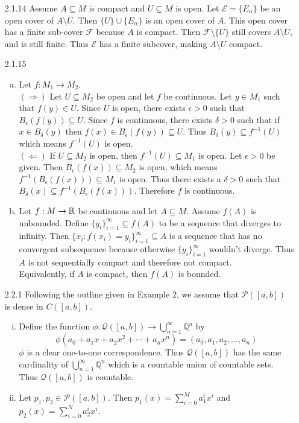 \documentclass[../../Solutions.tex]{subfiles}
\begin{document}
\begin{itemize}
	\item [2.1.14] Assume $A \subseteq M$ is compact and $U \subseteq M$ is open.
		Let $\mathcal{E} = \{E_\alpha\}$ be an open cover of $A \setminus U$.
		Then $\{U\} \cup \{E_\alpha\}$ is an open cover of $A$.
		This open cover has a finite sub-cover $\mathcal{F}$ because $A$ is compact.
		Then $\mathcal{F} \setminus \{U\}$ still covers $A \setminus U$, and is still finite.
		Thus $\mathcal{E}$ has a finite subcover, making $A \setminus U$ compact.
		
	\item [2.1.15]
	\begin{enumerate}[(a)]
		\item Let $f:M_1 \to M_2$. \\
			$(\Rightarrow)$ Let $U \subseteq M_2$ be open and let $f$ be continuous.
			Let $y \in M_1$ such that $f(y) \in U$.
			Since $U$ is open, there exists $\epsilon > 0$ such that $B_\epsilon(f(y)) \subseteq U$.
			Since $f$ is continuous, there exists $\delta > 0$ such that if $x \in B_\delta(y)$ then $f(x) \in B_\epsilon(f(y)) \subseteq U$.
			Thus $B_\delta(y) \subseteq f^{-1}(U)$ which means $f^{-1}(U)$ is open. \\
			$(\Leftarrow)$ If $U \subseteq M_2$ is open, then $f^{-1}(U) \subseteq M_1$ is open.
			Let $\epsilon > 0$ be given.
			Then $B_\epsilon(f(x)) \subseteq M_2$ is open, which means $f^{-1}(B_\epsilon(f(x))) \subseteq M_1$ is open.
			Thus there exists a $\delta > 0$ such that $B_\delta(x) \subseteq f^{-1}(B_\epsilon(f(x)))$.
			Therefore $f$ is continuous.
		\item Let $f:M \to \mathbb{R}$ be continuous and let $A \subseteq M$.
			Assume $f(A)$ is unbounded.
			Define $\{y_i\}_{i=1}^\infty \subseteq f(A)$ to be a sequence that diverges to infinity.
			Then $\{x_i:f(x_i) = y_i\}_{i=1}^\infty \subseteq A$ is a sequence that has no convergent subsequence because otherwise $\{y_i\}_{i=1}^\infty$ wouldn't diverge.
			Thus $A$ is not sequentially compact and therefore not compact. \\
			Equivalently, if $A$ is compact, then $f(A)$ is bounded.
	\end{enumerate}
	
	\item [2.2.1] Following the outline given in Example 2, we assume that $\mathcal{P}([a,b])$ is dense in $C([a,b])$.
	\begin{enumerate}[(i)]
		\item Define the function $\phi : \mathcal{Q}([a,b]) \to \bigcup_{n=1}^\infty \mathbb{Q}^n$ by
			$$ \phi(a_0+a_1x+a_2x^2+\cdots + a_nx^n) = (a_0,a_1,a_2,\dots,a_n) $$
			$\phi$ is a clear one-to-one correspondence.
			Thus $\mathcal{Q}([a,b])$ has the same cardinality of $\bigcup_{n=1}^\infty \mathbb{Q}^n$ which is a countable union of countable sets.
			Thus $\mathcal{Q}([a,b])$ is countable.
		\item Let $p_1,p_2 \in \mathcal{P}([a,b])$.
			Then $p_1(x) = \sum_{i=0}^M a_1^i x^i$ and $p_2(x) = \sum_{i=0}^N a_2^i x^i$.
	\end{enumerate}
	

\end{itemize}
\end{document}
